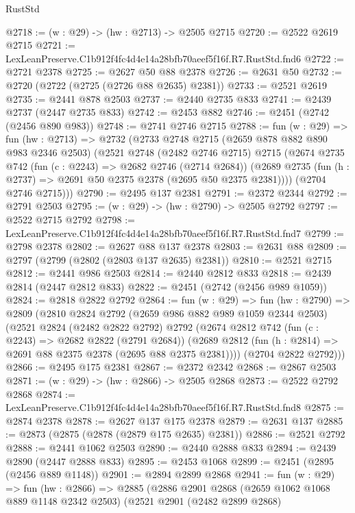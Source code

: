 \begin{lexlean}{RustStd}
\begin{coremodule}
@2718 := (w : @29) -> (hw : @2713) -> @2505 @2715
@2720 := @2522 @2619 @2715
@2721 := LexLeanPreserve.C1b912f4fc4d4e14a28bfb70aeef5f16f.R7.RustStd.fnd6
@2722 := @2721 @2378
@2725 := @2627 @50 @88 @2378
@2726 := @2631 @50
@2732 := @2720 (@2722 (@2725 (@2726 @88 @2635) @2381))
@2733 := @2521 @2619
@2735 := @2441 @878 @2503
@2737 := @2440 @2735 @833
@2741 := @2439 @2737 (@2447 @2735 @833)
@2742 := @2453 @882
@2746 := @2451 (@2742 (@2456 @890 @983))
@2748 := @2741 @2746 @2715
@2788 := fun (w : @29) =>
  fun (hw : @2713) =>
  @2732
    (@2733
      @2748
      @2715
      (@2659 @878 @882 @890 @983 @2346 @2503)
      (@2521
        @2748
        (@2482 @2746 @2715)
        @2715
        (@2674
          @2735
          @742
          (fun (c : @2243) => @2682 @2746 (@2714 @2684))
          (@2689 @2735 (fun (h : @2737) => @2691 @50 @2375 @2378 (@2695 @50 @2375 @2381))))
        (@2704 @2746 @2715)))
@2790 := @2495 @137 @2381
@2791 := @2372 @2344
@2792 := @2791 @2503
@2795 := (w : @29) -> (hw : @2790) -> @2505 @2792
@2797 := @2522 @2715 @2792
@2798 := LexLeanPreserve.C1b912f4fc4d4e14a28bfb70aeef5f16f.R7.RustStd.fnd7
@2799 := @2798 @2378
@2802 := @2627 @88 @137 @2378
@2803 := @2631 @88
@2809 := @2797 (@2799 (@2802 (@2803 @137 @2635) @2381))
@2810 := @2521 @2715
@2812 := @2441 @986 @2503
@2814 := @2440 @2812 @833
@2818 := @2439 @2814 (@2447 @2812 @833)
@2822 := @2451 (@2742 (@2456 @989 @1059))
@2824 := @2818 @2822 @2792
@2864 := fun (w : @29) =>
  fun (hw : @2790) =>
  @2809
    (@2810
      @2824
      @2792
      (@2659 @986 @882 @989 @1059 @2344 @2503)
      (@2521
        @2824
        (@2482 @2822 @2792)
        @2792
        (@2674
          @2812
          @742
          (fun (c : @2243) => @2682 @2822 (@2791 @2684))
          (@2689 @2812 (fun (h : @2814) => @2691 @88 @2375 @2378 (@2695 @88 @2375 @2381))))
        (@2704 @2822 @2792)))
@2866 := @2495 @175 @2381
@2867 := @2372 @2342
@2868 := @2867 @2503
@2871 := (w : @29) -> (hw : @2866) -> @2505 @2868
@2873 := @2522 @2792 @2868
@2874 := LexLeanPreserve.C1b912f4fc4d4e14a28bfb70aeef5f16f.R7.RustStd.fnd8
@2875 := @2874 @2378
@2878 := @2627 @137 @175 @2378
@2879 := @2631 @137
@2885 := @2873 (@2875 (@2878 (@2879 @175 @2635) @2381))
@2886 := @2521 @2792
@2888 := @2441 @1062 @2503
@2890 := @2440 @2888 @833
@2894 := @2439 @2890 (@2447 @2888 @833)
@2895 := @2453 @1068
@2899 := @2451 (@2895 (@2456 @889 @1148))
@2901 := @2894 @2899 @2868
@2941 := fun (w : @29) =>
  fun (hw : @2866) =>
  @2885
    (@2886
      @2901
      @2868
      (@2659 @1062 @1068 @889 @1148 @2342 @2503)
      (@2521
        @2901
        (@2482 @2899 @2868)

\end{coremodule}
\end{lexlean}
